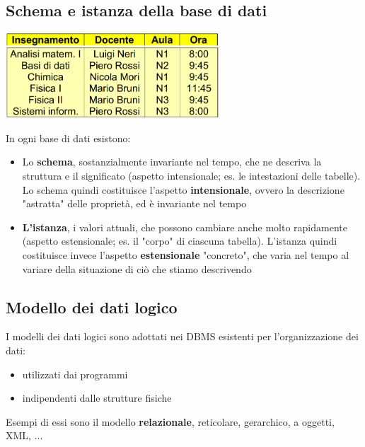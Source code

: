 \documentclass[12pt]{article}
\begin{document}
\subsection{Schema e istanza della base di dati}
\begin{center}
    \includegraphics[width = 0.60\textwidth]{Images/5.PNG}
\end{center}
In ogni base di dati esistono:
\begin{itemize}
    \item Lo \textbf{schema}, sostanzialmente invariante nel tempo, che ne descriva la struttura e il significato (aspetto intensionale; es. le intestazioni delle tabelle). Lo schema quindi costituisce l'aspetto \textbf{intensionale}, ovvero la descrizione "astratta" delle proprietà, ed è invariante nel tempo
    \item \textbf{L'istanza}, i valori attuali, che possono cambiare anche molto rapidamente (aspetto estensionale; es. il "corpo" di ciascuna tabella). L'istanza quindi costituisce invece l'aspetto \textbf{estensionale} "concreto", che varia nel tempo al variare della situazione di ciò che stiamo descrivendo
\end{itemize}
\subsection{Modello dei dati logico}
I modelli dei dati logici sono adottati nei DBMS esistenti per l'organizzazione dei dati:
\begin{itemize}
    \item utilizzati dai programmi
    \item indipendenti dalle strutture fisiche
\end{itemize}
Esempi di essi sono il modello \textbf{relazionale}, reticolare, gerarchico, a oggetti, XML, ...
\end{document}
